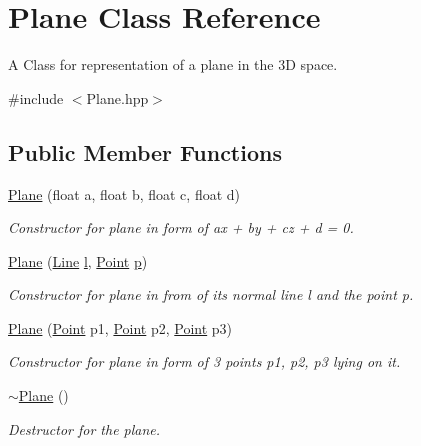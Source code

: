 \hypertarget{class_plane}{}\section{Plane Class Reference}
\label{class_plane}


A Class for representation of a plane in the 3D space.  




{\ttfamily \#include $<$Plane.\+hpp$>$}

\subsection*{Public Member Functions}
\begin{DoxyCompactItemize}
\item 
\mbox{\hyperlink{class_plane_a9a1420228e8baa632c7e8ba66f27772f}{Plane}} (float a, float b, float c, float d)
\begin{DoxyCompactList}\small\item\em Constructor for plane in form of ax + by + cz + d = 0. \end{DoxyCompactList}\item 
\mbox{\hyperlink{class_plane_aa3f7f255d3a4118e39ae6f0f6fd6e908}{Plane}} (\mbox{\hyperlink{class_line}{Line}} \mbox{\hyperlink{class_plane_aafdc7fc15019da566e4cdf760f1eaf17}{l}}, \mbox{\hyperlink{class_point}{Point}} \mbox{\hyperlink{class_plane_ad289dccce2529d46275e4fb6878a8625}{p}})
\begin{DoxyCompactList}\small\item\em Constructor for plane in from of it\textquotesingle{}s normal line l and the point p. \end{DoxyCompactList}\item 
\mbox{\hyperlink{class_plane_a14592fa1140200468ddcbeb5ace8dde6}{Plane}} (\mbox{\hyperlink{class_point}{Point}} p1, \mbox{\hyperlink{class_point}{Point}} p2, \mbox{\hyperlink{class_point}{Point}} p3)
\begin{DoxyCompactList}\small\item\em Constructor for plane in form of 3 points p1, p2, p3 lying on it. \end{DoxyCompactList}\item 
\mbox{\hyperlink{class_plane_a69abd86051c880dcb44b249ad10c4436}{$\sim$\+Plane}} ()
\begin{DoxyCompactList}\small\item\em Destructor for the plane. \end{DoxyCompactList}\item 

\end{DoxyCompactItemize}
